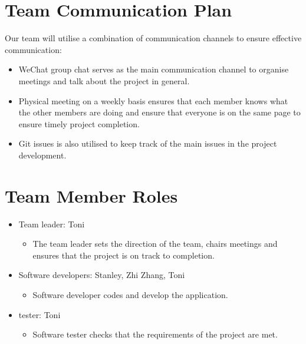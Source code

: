 \documentclass{article}
\begin{document}
\section{Team Communication Plan}
Our team will utilise a combination of communication channels to ensure effective communication:
\begin{itemize}
    \item WeChat group chat serves as the main communication channel to organise meetings and talk about the project in general.
    \item Physical meeting on a weekly basis ensures that each member knows what the other members are doing and ensure that everyone is on the same page to ensure timely project completion.
    \item Git issues is also utilised to keep track of the main issues in the project development.
\end{itemize}

\section{Team Member Roles}
\begin{itemize}
    \item Team leader: Toni
    \begin{itemize}
        \item The team leader sets the direction of the team, chairs meetings and ensures that the project is on track to completion.
    \end{itemize}
\end{itemize}

\begin{itemize}
    \item Software developers: Stanley, Zhi Zhang, Toni
    \begin{itemize}
        \item Software developer codes and develop the application.
    \end{itemize}
\end{itemize}

\begin{itemize}
    \item tester: Toni
    \begin{itemize}
        \item Software tester checks that the requirements of the project are met.
    \end{itemize}
\end{itemize}
\end{document}
